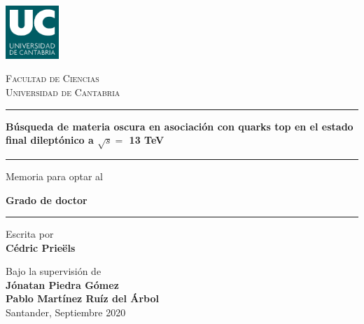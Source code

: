 \documentclass[a4paper, 10pt, openright]{report}
\begin{document}

\thispagestyle{empty}
\phantom{a}
\vfill
\newpage

\begin{titlepage}

	\centering
	\includegraphics[width=0.15\textwidth]{figs/image_UC.png}\par
	{\scshape\LARGE Facultad de Ciencias \\ \vspace{-15pt} Universidad de Cantabria \par}
	
	\vspace{0.8cm}
	
	\noindent\rule{15cm}{0.4pt}\par 
	{\huge\bfseries B\'{u}squeda de materia oscura en asociaci\'{o}n con quarks top en el estado final dilept\'{o}nico a $\sqrt{s} = $ 13 TeV\par \vspace{10pt}}
	\noindent\rule{15cm}{0.4pt}\par 
	
	{\vspace{20pt} \Large Memoria para optar al \par \LARGE \textbf{Grado de doctor} \vspace{20pt} \par \noindent\rule{15cm}{0.4pt}}
	
	\vspace{0.8cm}
	{\Large Escrita por \\ \textbf{C\'{e}dric Prie\"{e}ls}\par}
	\vspace{0.5cm}
	{\Large Bajo la supervisi\'{o}n de \\ \textbf{J\'{o}natan Piedra G\'{o}mez} \\
	\vspace{-10pt}
	\textbf{Pablo Mart\'{i}nez Ru\'{i}z del \'{A}rbol}\\}
	\vspace{1.4cm}
	{\Large Santander, Septiembre 2020}
	\vfill

\end{titlepage}

\end{document}
